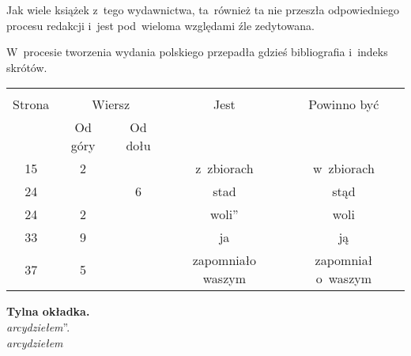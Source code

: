 \documentclass[a4paper,11pt]{article}
\begin{document}


\start Jak wiele książek z~tego wydawnictwa, ta~również ta nie
przeszła odpowiedniego procesu redakcji i~jest pod~wieloma względami
źle zedytowana.

\vspace{\spaceFour}


\start W~procesie tworzenia wydania polskiego przepadła gdzieś
bibliografia i~indeks skrótów.







\begin{center}

  \begin{tabular}{|c|c|c|c|c|}
    \hline
    & \multicolumn{2}{c|}{} & & \\
    Strona & \multicolumn{2}{c|}{Wiersz} & Jest
                              & Powinno być \\ \cline{2-3}
    & Od góry & Od dołu & & \\
    \hline
    15  &  2 & & z~zbiorach & w~zbiorach \\
    24  & &  6 & stad & stąd \\
    24  &  2 & & woli” & woli \\
    33  &  9 & & ja & ją \\
    37  &  5 & & zapomniało waszym & zapomniał o~waszym \\
    \hline
  \end{tabular}

\end{center}


\noindent
\textbf{Tylna okładka.} \\
\Jest  \textit{arcydziełem}”. \\
\Powin \textit{arcydziełem} \\

\vspace{\spaceTwo}










\end{document}
